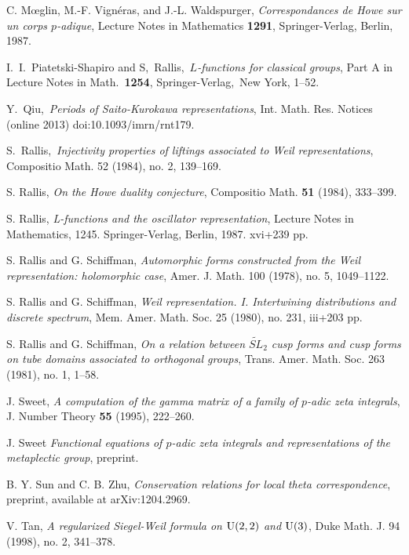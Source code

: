 \documentclass[10pt]{amsart}
\theoremstyle{plain}
\numberwithin{equation}{section}
\begin{document}
\begin{thebibliography}{99}
C. M{\oe}glin, M.-F. Vign{\'e}ras, and J.-L. Waldspurger,
\emph{Correspondances de Howe sur un corps $p$-adique},
Lecture Notes in Mathematics \textbf{1291}, Springer-Verlag, Berlin,
1987.

I.\ I.\ Piatetski-Shapiro and S,\ Rallis,\ {\it $L$-functions
for classical groups}, Part A in Lecture Notes in Math.\ \textbf{1254},
Springer-Verlag,\ New York, 1--52.

 Y.\ Qiu,\ {\it Periods of Saito-Kurokawa representations}, Int. Math. Res. Notices (online 2013) doi:10.1093/imrn/rnt179.

S.\ Rallis,\ {\it Injectivity properties of liftings associated to
  Weil representations}, Compositio Math. 52 (1984), no. 2, 139--169.

S. Rallis,
\emph{On the Howe duality conjecture},
Compositio Math. \textbf{51} (1984), 333--399.

 S. Rallis, {\em L-functions and the oscillator
    representation}, Lecture Notes in Mathematics,
  1245. Springer-Verlag, Berlin, 1987. xvi+239 pp.

 S. Rallis and G. Schiffman, {\em Automorphic forms
    constructed from the Weil representation: holomorphic case},
  Amer. J. Math. 100 (1978), no. 5, 1049--1122.

 S. Rallis and G. Schiffman, {\em Weil
    representation. I. Intertwining distributions and discrete
    spectrum},  Mem. Amer. Math. Soc. 25 (1980), no. 231, iii+203 pp. 

 S. Rallis and G. Schiffman, {\em On a relation
    between $\tilde{SL}_2$ cusp forms and cusp forms on tube domains
    associated to orthogonal groups},  Trans. Amer. Math. Soc. 263
  (1981), no. 1, 1--58.

J. Sweet,
\emph{A computation of the gamma matrix of a family of $p$-adic zeta integrals},
J. Number Theory \textbf{55} (1995), 222--260.

J. Sweet
\emph{Functional equations of $p$-adic zeta integrals
 and representations of the metaplectic group},
preprint.

 B. Y. Sun and C. B. Zhu, {\em Conservation relations
    for local theta correspondence}, preprint, available at  arXiv:1204.2969. 

 V. Tan, {\em A regularized Siegel-Weil formula on ${\rm U}(2,2)$ and ${\rm U}(3)$}, Duke Math. J. 94 (1998), no. 2, 341--378.


\end{thebibliography}
\end{document}

